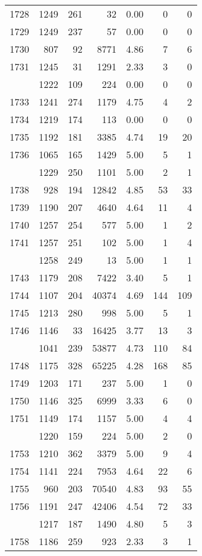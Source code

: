 \documentclass[
]{article}
\begin{document}
\begin{table}
\begin{tabular}[t]{lrrrrrr}
1728 & 1249 & 261 & 32 & 0.00 & 0 & 0\\
1729 & 1249 & 237 & 57 & 0.00 & 0 & 0\\
1730 & 807 & 92 & 8771 & 4.86 & 7 & 6\\
1731 & 1245 & 31 & 1291 & 2.33 & 3 & 0\\
\addlinespace
1732 & 1222 & 109 & 224 & 0.00 & 0 & 0\\
1733 & 1241 & 274 & 1179 & 4.75 & 4 & 2\\
1734 & 1219 & 174 & 113 & 0.00 & 0 & 0\\
1735 & 1192 & 181 & 3385 & 4.74 & 19 & 20\\
1736 & 1065 & 165 & 1429 & 5.00 & 5 & 1\\
\addlinespace
1737 & 1229 & 250 & 1101 & 5.00 & 2 & 1\\
1738 & 928 & 194 & 12842 & 4.85 & 53 & 33\\
1739 & 1190 & 207 & 4640 & 4.64 & 11 & 4\\
1740 & 1257 & 254 & 577 & 5.00 & 1 & 2\\
1741 & 1257 & 251 & 102 & 5.00 & 1 & 4\\
\addlinespace
1742 & 1258 & 249 & 13 & 5.00 & 1 & 1\\
1743 & 1179 & 208 & 7422 & 3.40 & 5 & 1\\
1744 & 1107 & 204 & 40374 & 4.69 & 144 & 109\\
1745 & 1213 & 280 & 998 & 5.00 & 5 & 1\\
1746 & 1146 & 33 & 16425 & 3.77 & 13 & 3\\
\addlinespace
1747 & 1041 & 239 & 53877 & 4.73 & 110 & 84\\
1748 & 1175 & 328 & 65225 & 4.28 & 168 & 85\\
1749 & 1203 & 171 & 237 & 5.00 & 1 & 0\\
1750 & 1146 & 325 & 6999 & 3.33 & 6 & 0\\
1751 & 1149 & 174 & 1157 & 5.00 & 4 & 4\\
\addlinespace
1752 & 1220 & 159 & 224 & 5.00 & 2 & 0\\
1753 & 1210 & 362 & 3379 & 5.00 & 9 & 4\\
1754 & 1141 & 224 & 7953 & 4.64 & 22 & 6\\
1755 & 960 & 203 & 70540 & 4.83 & 93 & 55\\
1756 & 1191 & 247 & 42406 & 4.54 & 72 & 33\\
\addlinespace
1757 & 1217 & 187 & 1490 & 4.80 & 5 & 3\\
1758 & 1186 & 259 & 923 & 2.33 & 3 & 1\\

\end{tabular}
\end{table}
\end{document}
